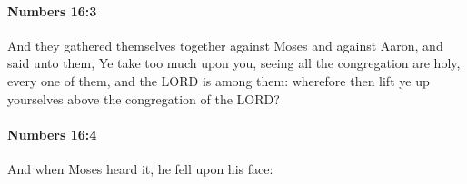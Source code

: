 		\paragraph{Numbers 16:3} %
			\label{NUMBERS-16-3}

			And they gathered themselves together against Moses and against Aaron, and said unto them, Ye take too much upon you, seeing all the congregation are holy, every one of them, and the LORD is among them: wherefore then lift ye up yourselves above the congregation of the LORD?


		\paragraph{Numbers 16:4} %
			\label{NUMBERS-16-4}

			And when Moses heard it, he fell upon his face:


